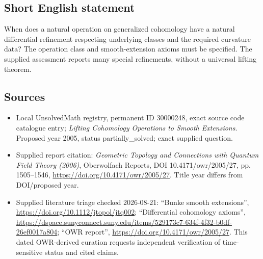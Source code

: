\documentclass[11pt]{article}
\begin{document}
\subsection{Short English statement}
When does a natural operation on generalized cohomology have a natural differential refinement respecting underlying classes and the required curvature data? The operation class and smooth-extension axioms must be specified. The supplied assessment reports many special refinements, without a universal lifting theorem.
\subsection{Sources}
\begin{itemize}
\item Local UnsolvedMath registry, permanent ID 30000248, exact source code catalogue entry; \emph{Lifting Cohomology Operations to Smooth Extensions}. Proposed year 2005, status partially\_solved; exact supplied question.
\item Supplied report citation: \emph{Geometric Topology and Connections with Quantum Field Theory (2006)}, Oberwolfach Reports, DOI 10.4171/owr/2005/27, pp. 1505--1546, \url{https://doi.org/10.4171/owr/2005/27}. Title year differs from DOI/proposed year.
\item Supplied literature triage checked 2026-08-21: ``Bunke smooth extensions'', \url{https://doi.org/10.1112/jtopol/jtq002}; ``Differential cohomology axioms'', \url{https://dspace.sunyconnect.suny.edu/items/529173c7-634f-4f32-b0df-26ef0017a804}; ``OWR report'', \url{https://doi.org/10.4171/owr/2005/27}. This dated OWR-derived curation requests independent verification of time-sensitive status and cited claims.
\end{itemize}
\end{document}

